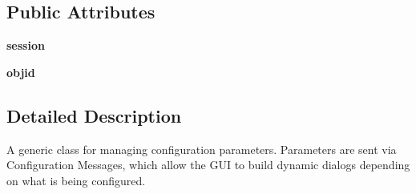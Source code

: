 \subsection*{Public Attributes}
\begin{DoxyCompactItemize}
\item 
\hypertarget{classcore_1_1conf_1_1_configurable_ac14f4df412110b6d0a28722371bf4ea6}{{\bfseries session}}\label{classcore_1_1conf_1_1_configurable_ac14f4df412110b6d0a28722371bf4ea6}

\item 
\hypertarget{classcore_1_1conf_1_1_configurable_af4818641eb7f672a528d3105cecdc2b0}{{\bfseries objid}}\label{classcore_1_1conf_1_1_configurable_af4818641eb7f672a528d3105cecdc2b0}

\end{DoxyCompactItemize}


\subsection{Detailed Description}
\begin{DoxyVerb}A generic class for managing configuration parameters.
    Parameters are sent via Configuration Messages, which allow the GUI
    to build dynamic dialogs depending on what is being configured.
\end{DoxyVerb}
 

